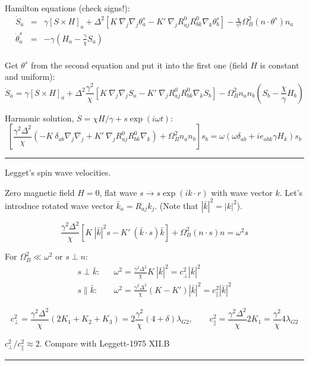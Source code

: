 \documentclass[a4paper]{article}
\begin{document}
Hamilton equations (check signs!):
\begin{eqnarray*}
\dot S_a
&=& \gamma [S\times H]_a
 + \Delta^2[K\ \nabla_j\nabla_j \theta_a^s
 - K'\ \nabla_j R^0_{aj} R^0_{bk} \nabla_k\theta_b^s]
- \frac{\chi}{\gamma^2}\Omega_B^2 (n\cdot\theta^s) n_a\\
\dot \theta_a^s &=& -\gamma \left(H_a-\frac{\gamma}{\chi} S_a\right)\\
\end{eqnarray*}

Get $\theta^s$ from the second equation and put it into the first one
(field $H$ is constant and uniform):
$$
\ddot S_a
= \gamma [S\times H]_a
+ \Delta^2\frac{\gamma^2}{\chi}
  [K\ \nabla_j\nabla_j S_a
 - K'\ \nabla_j R^0_{aj}R^0_{bk}\nabla_k  S_b]
- \Omega_B^2 n_a n_b ( S_b -\frac{\chi}{\gamma}H_b)
$$

Harmonic solution, $S = \chi H/\gamma + s \exp(i\omega t)$:
$$
\left[
\frac{\gamma^2\Delta^2}{\chi}
  (-K\ \delta_{ab} \nabla_j\nabla_j
 + K'\ \nabla_j R^0_{aj}R^0_{bk}\nabla_k)
+ {\Omega_B^2} n_a n_b
\right] s_b =
\omega (\omega \delta_{ab} + i e_{abk} \gamma H_k ) s_b
$$

\eject
\hrule
\medskip

Legget's spin wave velocities.

Zero magnetic field $H=0$, flat wave $s\rightarrow s\exp(i k\cdot r)$ with
wave vector $k$.
Let's introduce rotated wave vector $\bar k_a = R_{aj} k_j$. (Note that
$|\bar k|^2 = |k|^2$).

$$
\frac{\gamma^2\Delta^2}{\chi}
  [K\ |\bar k|^2 s - K'\ (\bar k \cdot s)\bar k]
+ \Omega_B^2 (n\cdot s)n
= \omega^2 s
$$

For $\Omega_B^2 \ll \omega^2$ or $s \perp n$:
\begin{eqnarray*}
s \perp \bar k:
&&
\omega^2
= \frac{\gamma^2\Delta^2}{\chi} K\ |\bar k|^2
= c_\perp^2 |\bar k|^2
\\
s \parallel \bar k:
&&
\omega^2
= \frac{\gamma^2\Delta^2}{\chi}(K - K')|\bar k|^2
= c_\parallel^2 |\bar k|^2
\end{eqnarray*}

$$
c_\perp^2 = \frac{\gamma^2\Delta^2}{\chi} (2K_1+K_2+K_3)
= 2\frac{\gamma^2}{\chi} (4+\delta)\lambda_{G2},
\qquad
c_\parallel^2 = \frac{\gamma^2\Delta^2}{\chi} 2K_1
= \frac{\gamma^2}{\chi} 4\lambda_{G2}
$$

$ c_\perp^2/c_\parallel^2 \approx 2$.
Compare with Leggett-1975 XII.B

\bigskip
\hrule
\medskip
\end{document}

